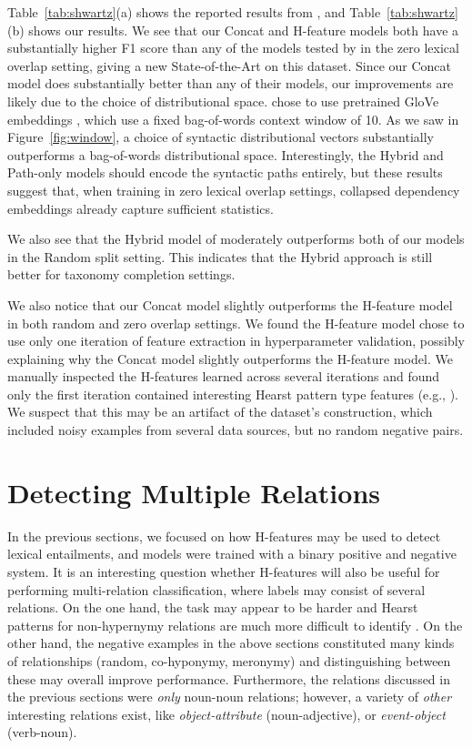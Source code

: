 Table~\ref{tab:shwartz}(a) shows the reported results from
, and Table~\ref{tab:shwartz}(b) shows our results.
We see that our Concat and H-feature models both have a substantially higher F1
score than any of the models tested by  in the zero
lexical overlap setting, giving a new State-of-the-Art on this dataset. Since
our Concat model does substantially better than any of their models, our
improvements are likely due to the choice of distributional space.
 chose to use pretrained GloVe embeddings
\cite{pennington:2014:emnlp}, which use a fixed bag-of-words context window of
10.  As we saw in Figure~\ref{fig:window}, a choice of syntactic distributional
vectors substantially outperforms a bag-of-words distributional space.
Interestingly, the Hybrid and Path-only models should encode the syntactic
paths entirely, but these results suggest that, when training in zero lexical
overlap settings, collapsed dependency embeddings already capture sufficient
statistics. 

We also see that the Hybrid model of  moderately
outperforms both of our models in the Random split setting. This indicates that
the Hybrid approach is still better for taxonomy completion settings.

We also notice that our Concat model slightly outperforms the H-feature model
in both random and zero overlap settings. We found the H-feature model chose to
use only one iteration of feature extraction in hyperparameter validation,
possibly explaining why the Concat model slightly outperforms the H-feature
model. We manually inspected the H-features learned across several iterations
and found only the first iteration contained interesting Hearst pattern type
features (e.g., ). We suspect that this may be an artifact of the
dataset's construction, which included noisy examples from several data
sources, but no random negative pairs.

\section{Detecting Multiple Relations}

In the previous sections, we focused on how H-features may be used to detect
lexical entailments, and models were trained with a binary positive and
negative system. It is an interesting question whether H-features will also be useful
for performing multi-relation classification, where labels may consist of
several relations. On the one hand, the task may appear to be harder and Hearst
patterns for non-hypernymy relations are much more difficult to identify \cite{girju:2006:cl}.
On the other hand, the negative examples in the above sections constituted
many kinds of relationships (random, co-hyponymy, meronymy) and distinguishing
between these may overall improve performance. Furthermore, the relations
discussed in the previous sections were {\em only} noun-noun relations; however,
a variety of {\em other} interesting relations exist, like
{\em object-attribute} (noun-adjective), or {\em event-object} (verb-noun).

